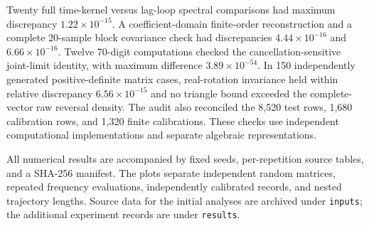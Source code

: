Twenty full time-kernel versus lag-loop spectral comparisons had maximum discrepancy $1.22\times10^{-15}$. A coefficient-domain finite-order reconstruction and a complete 20-sample block covariance check had discrepancies $4.44\times10^{-16}$ and $6.66\times10^{-16}$. Twelve 70-digit computations checked the cancellation-sensitive joint-limit identity, with maximum difference $3.89\times10^{-54}$. In 150 independently generated positive-definite matrix cases, real-rotation invariance held within relative discrepancy $6.56\times10^{-15}$ and no triangle bound exceeded the complete-vector raw reversal density. The audit also reconciled the 8,520 test rows, 1,680 calibration rows, and 1,320 finite calibrations. These checks use independent computational implementations and separate algebraic representations.

All numerical results are accompanied by fixed seeds, per-repetition source tables, and a SHA-256 manifest. The plots separate independent random matrices, repeated frequency evaluations, independently calibrated records, and nested trajectory lengths. Source data for the initial analyses are archived under \texttt{inputs}; the additional experiment records are under \texttt{results}.
